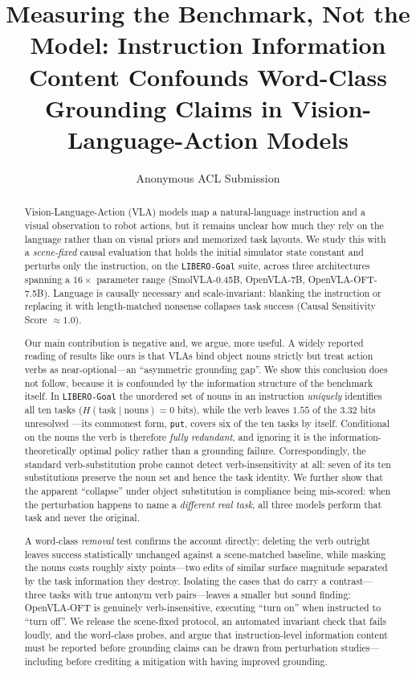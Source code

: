 \documentclass[11pt]{article}
\title{Measuring the Benchmark, Not the Model: Instruction Information Content
Confounds Word-Class Grounding Claims in Vision-Language-Action Models}
\author{Anonymous ACL Submission}
\date{}
\begin{document}
\maketitle

\begin{abstract}
Vision-Language-Action (VLA) models map a natural-language instruction and a
visual observation to robot actions, but it remains unclear how much they rely on
the language rather than on visual priors and memorized task layouts. We study
this with a \emph{scene-fixed} causal evaluation that holds the initial simulator
state constant and perturbs only the instruction, on the \texttt{LIBERO-Goal}
suite, across three architectures spanning a $16\times$ parameter range
(SmolVLA-0.45B, OpenVLA-7B, OpenVLA-OFT-7.5B). Language is causally necessary and
scale-invariant: blanking the instruction or replacing it with length-matched
nonsense collapses task success (Causal Sensitivity Score $\approx 1.0$).

Our main contribution is negative and, we argue, more useful. A widely reported
reading of results like ours is that VLAs bind object nouns strictly but treat
action verbs as near-optional---an ``asymmetric grounding gap''. We show this
conclusion does not follow, because it is confounded by the information structure
of the benchmark itself. In \texttt{LIBERO-Goal} the unordered set of nouns in an
instruction \emph{uniquely} identifies all ten tasks ($H(\text{task}\mid
\text{nouns})=0$ bits), while the verb leaves $1.55$ of the $3.32$ bits unresolved
---its commonest form, \texttt{put}, covers six of the ten tasks by itself.
Conditional on the nouns the
verb is therefore \emph{fully redundant}, and ignoring it is the
information-theoretically optimal policy rather than a grounding failure.
Correspondingly, the standard verb-substitution probe cannot detect
verb-insensitivity at all: seven of its ten substitutions preserve the noun set
and hence the task identity. We further show that the apparent ``collapse'' under
object substitution is compliance being mis-scored: when the perturbation happens
to name a \emph{different real task}, all three models perform that task and never
the original.

A word-class \emph{removal} test confirms the account directly: deleting the verb
outright leaves success statistically unchanged against a scene-matched baseline,
while masking the nouns costs roughly sixty points---two edits of similar surface
magnitude separated by the task information they destroy. Isolating the cases that do
carry a contrast---three tasks with true antonym verb pairs---leaves a smaller but
sound finding: OpenVLA-OFT is genuinely verb-insensitive, executing ``turn on'' when
instructed to ``turn off''. We release the scene-fixed protocol, an automated
invariant check that fails loudly, and the word-class probes, and argue that
instruction-level information content must be reported before grounding claims can be
drawn from perturbation studies---including before crediting a mitigation with having
improved grounding.
\end{abstract}
\end{document}

